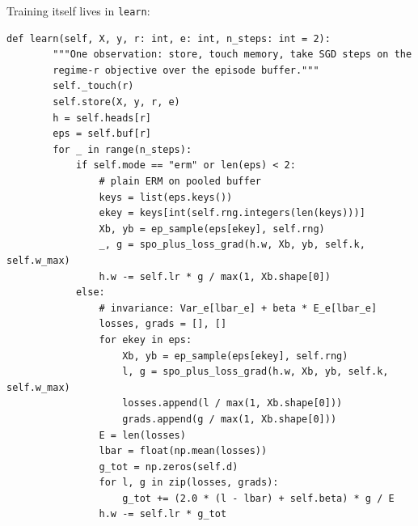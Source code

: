 Training itself lives in \texttt{learn}:

\begin{lstlisting}[caption={ERM vs.\ invariance training over the episode buffer (\texttt{risp.py}).},label={lst:dd6-learn}]
    def learn(self, X, y, r: int, e: int, n_steps: int = 2):
        """One observation: store, touch memory, take SGD steps on the
        regime-r objective over the episode buffer."""
        self._touch(r)
        self.store(X, y, r, e)
        h = self.heads[r]
        eps = self.buf[r]
        for _ in range(n_steps):
            if self.mode == "erm" or len(eps) < 2:
                # plain ERM on pooled buffer
                keys = list(eps.keys())
                ekey = keys[int(self.rng.integers(len(keys)))]
                Xb, yb = ep_sample(eps[ekey], self.rng)
                _, g = spo_plus_loss_grad(h.w, Xb, yb, self.k, self.w_max)
                h.w -= self.lr * g / max(1, Xb.shape[0])
            else:
                # invariance: Var_e[lbar_e] + beta * E_e[lbar_e]
                losses, grads = [], []
                for ekey in eps:
                    Xb, yb = ep_sample(eps[ekey], self.rng)
                    l, g = spo_plus_loss_grad(h.w, Xb, yb, self.k, self.w_max)
                    losses.append(l / max(1, Xb.shape[0]))
                    grads.append(g / max(1, Xb.shape[0]))
                E = len(losses)
                lbar = float(np.mean(losses))
                g_tot = np.zeros(self.d)
                for l, g in zip(losses, grads):
                    g_tot += (2.0 * (l - lbar) + self.beta) * g / E
                h.w -= self.lr * g_tot
\end{lstlisting}

